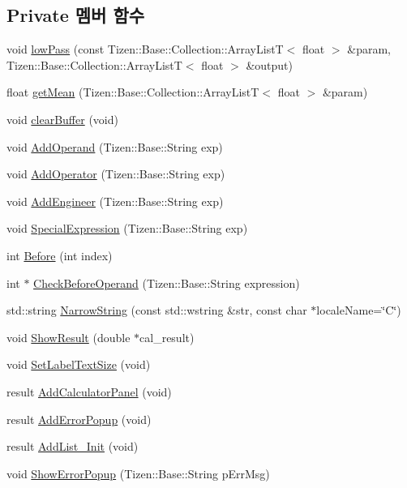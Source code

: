 \subsection*{Private 멤버 함수}
\begin{DoxyCompactItemize}
\item 
void \hyperlink{class_calculator_form_a7219388d7692193e44e149d822035231}{low\+Pass} (const Tizen\+::\+Base\+::\+Collection\+::\+Array\+List\+T$<$ float $>$ \&param, Tizen\+::\+Base\+::\+Collection\+::\+Array\+List\+T$<$ float $>$ \&output)
\item 
float \hyperlink{class_calculator_form_a832965e97b000380703993d2c61e357a}{get\+Mean} (Tizen\+::\+Base\+::\+Collection\+::\+Array\+List\+T$<$ float $>$ \&param)
\item 
void \hyperlink{class_calculator_form_a3c0dcddf79a19546615f51c2acf989a9}{clear\+Buffer} (void)
\item 
void \hyperlink{class_calculator_form_ad23e66a668778e9354b831dbac18a689}{Add\+Operand} (Tizen\+::\+Base\+::\+String exp)
\item 
void \hyperlink{class_calculator_form_a5c68963771fb4527131e84d4963d7c14}{Add\+Operator} (Tizen\+::\+Base\+::\+String exp)
\item 
void \hyperlink{class_calculator_form_af7bffc0f7f761c4b89fb12a8020c161e}{Add\+Engineer} (Tizen\+::\+Base\+::\+String exp)
\item 
void \hyperlink{class_calculator_form_a1f4a4d59cba6dad371b5519fb254e6f2}{Special\+Expression} (Tizen\+::\+Base\+::\+String exp)
\item 
int \hyperlink{class_calculator_form_af8fd474cf2173be9fa0dbbdfc114b5b3}{Before} (int index)
\item 
int $\ast$ \hyperlink{class_calculator_form_ac322abae9350aee54dba283e68c94d5d}{Check\+Before\+Operand} (Tizen\+::\+Base\+::\+String expression)
\item 
std\+::string \hyperlink{class_calculator_form_a861aa95341240a0d98db563acc753bca}{Narrow\+String} (const std\+::wstring \&str, const char $\ast$locale\+Name=\char`\"{}C\char`\"{})
\item 
void \hyperlink{class_calculator_form_af9b618f4e52e683e4af58fbd6c0d9f1b}{Show\+Result} (double $\ast$cal\+\_\+result)
\item 
void \hyperlink{class_calculator_form_ac55d87afff38e894b348eeb01a058c70}{Set\+Label\+Text\+Size} (void)
\item 
result \hyperlink{class_calculator_form_a52e5c1d6ce0269a59bebb3921206a7f8}{Add\+Calculator\+Panel} (void)
\item 
result \hyperlink{class_calculator_form_a06eb55916ba3f358cbe5502eb5f12cff}{Add\+Error\+Popup} (void)
\item 
result \hyperlink{class_calculator_form_ab703941d3327dc7ec09c377427786ecd}{Add\+List\+\_\+\+Init} (void)
\item 
void \hyperlink{class_calculator_form_a47822c0c78fff69b9d3ebdb8a5f9a7a4}{Show\+Error\+Popup} (Tizen\+::\+Base\+::\+String p\+Err\+Msg)
\end{DoxyCompactItemize}


